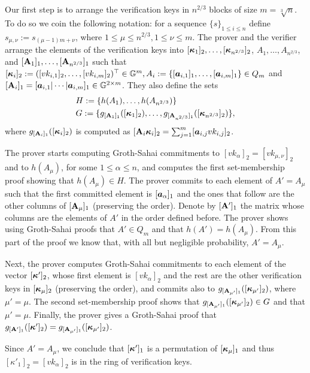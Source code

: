 Our first step is to arrange the verification keys in $n^{2/3}$ blocks of size $m=\sqrt[3]{n}$. To do so we coin the following notation: for a sequence $\{s\}_{1\leq i \leq n}$ define $s_{\mu,\nu}:=s_{(\mu-1)m+\nu}$, where  $1\leq\mu\leq n^{2/3},1\leq \nu\leq m$.  The prover and the verifier arrange the elements of the verification keys into $[{\boldsymbol{\kappa}}_1]_2,\ldots, [{\boldsymbol{\kappa}}_{n^{2/3}}]_2$, $A_1,\ldots, A_{n^{2/3}}$, and $[\mathbf{{A}}_1]_1,\ldots, [\mathbf{{A}}_{n^{2/3}}]_1$ such that $[{\boldsymbol{\kappa}}_i]_2:= ([vk_{i,1}]_2,\ldots,[vk_{i,m}]_2)^\top\in\mathbb{G}^m, A_i:=\{[{\boldsymbol{a}}_{i,1}]_1,\ldots,[{\boldsymbol{a}}_{i,m}]_1\}\in Q_m$ and $[\mathbf{{A}}_i]_1=[{\boldsymbol{a}}_{i,1}|\cdots|{\boldsymbol{a}}_{i,m}]_1\in\mathbb{G}^{2\times m}$. They also define the sets
\begin{align*}
&H:=\{h(A_1),\ldots,\allowbreak h(A_{n^{2/3}})\}\\
&G:=\{g_{[\mathbf{{A}}_1]_1}([{\boldsymbol{\kappa}}_1]_2),\allowbreak\ldots,g_{[\mathbf{{A}}_{n^{2/3}}]_1}([{\boldsymbol{\kappa}}_{n^{2/3}}]_2)\},
\end{align*}
where $g_{[\mathbf{{A}}_i]_1}([{\boldsymbol{\kappa}}_i]_2)$ is computed as $[\mathbf{{A}}_i{\boldsymbol{\kappa}}_i]_2=\sum_{j=1}^m [{\boldsymbol{a}}_{i,j}vk_{i,j}]_2$.

The prover starts computing Groth-Sahai commitments to $[vk_\alpha]_2=[vk_{\mu,\nu}]_2$ and to $h(A_\mu)$, for some $1\leq \alpha \leq n$, and computes the first set-membership proof showing that $h(A_\mu)\in H$.
The prover commits to each element of $A'=A_\mu$ such that the first committed element is $[{\boldsymbol{a}}_\alpha]_1$ and the ones that follow are the other columns of $[\mathbf{{A}}_\mu]_1$ (preserving the order). Denote by $[\mathbf{{A}}']_1$ the matrix whose columns are the elements of $A'$ in the order defined before.  The prover shows using Groth-Sahai proofs that $A'\in Q_m$ and that $h(A')=h(A_\mu)$. From this part of the proof we know that, with all but negligible probability, $A'=A_\mu$.

Next, the prover computes Groth-Sahai commitments to each element of the vector $[{\boldsymbol{\kappa}}']_2$, whose first element is $[vk_\alpha]_2$ and the rest are the other verification keys in $[{\boldsymbol{\kappa}}_\mu]_2$ (preserving the order), and commits also to $g_{[\mathbf{{A_{\mu'}}}]_1}([{\boldsymbol{\kappa}}_{\mu'}]_2)$, where $\mu'=\mu$. The second set-membership proof shows that $g_{[\mathbf{{A_{\mu'}}}]_1}([{\boldsymbol{\kappa}}_{\mu'}]_2)\in G$ and that $\mu'=\mu$. Finally, the prover gives a Groth-Sahai proof that $g_{[\mathbf{{A}}']_1}([{\boldsymbol{\kappa}}']_2)=g_{[\mathbf{{A_{\mu'}}}]_1}([{\boldsymbol{\kappa}}_{\mu'}]_2)$.

Since $A'=A_\mu$, we conclude that $[{\boldsymbol{\kappa}}']_1$ is a permutation of $[{\boldsymbol{\kappa}}_\mu]_1$ and thus $[\kappa'_1]_2=[vk_\alpha]_2$ is in the ring of verification keys.